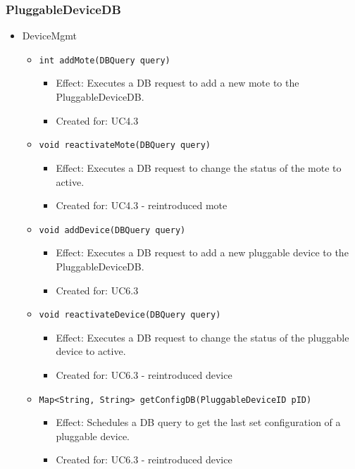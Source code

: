 {{{    \subsubsection{PluggableDeviceDB}
        \begin{itemize}
        	\item DeviceMgmt
        	\begin{itemize}
                \item \texttt{int addMote(DBQuery query)}
            		\begin{itemize}
            			\item Effect: Executes a DB request to add a new mote to the PluggableDeviceDB.
            			\item Created for: UC4.3
            		\end{itemize}
                \item \texttt{void reactivateMote(DBQuery query)}
                    \begin{itemize}
                        \item Effect: Executes a DB request to change the status of the mote to active.
                        \item Created for: UC4.3 - reintroduced mote
                    \end{itemize}
                \item \texttt{void addDevice(DBQuery query)}
                    \begin{itemize}
                        \item Effect: Executes a DB request to add a new pluggable device to the PluggableDeviceDB.
                        \item Created for: UC6.3
                    \end{itemize}
                \item \texttt{void reactivateDevice(DBQuery query)}
                    \begin{itemize}
                        \item Effect: Executes a DB request to change the status of the pluggable device to active.
                        \item Created for: UC6.3 - reintroduced device
                    \end{itemize}
                \item \texttt{Map<String, String> getConfigDB(PluggableDeviceID pID)}
                    \begin{itemize}
                        \item Effect: Schedules a DB query to get the last set configuration of a pluggable device.
                        \item Created for: UC6.3 - reintroduced device
                    \end{itemize}
        	\end{itemize}


\end{itemize}}}}
